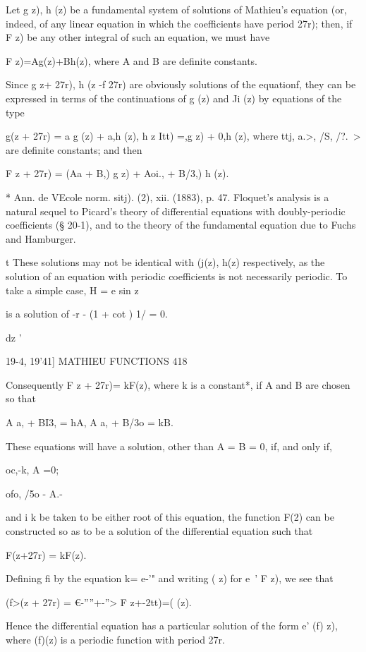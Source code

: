 Let g z), h (z) be a fundamental system of solutions of Mathieu's
equation (or, indeed, of any linear equation in which the coefficients
have period 27r); then, if F z) be any other integral of such an
equation, we must have

F z)=Ag(z)+Bh(z), where A and B are definite constants.

Since g z+ 27r), h (z -f 27r) are obviously solutions of the
equationf, they can be expressed in terms of the continuations of g
(z) and Ji (z) by equations of the type

g(z + 27r) = a g (z) + a,h (z), h z Itt) =,g z) + 0,h (z), where ttj,
a.>, /S, /?.\ > are definite constants; and then

F z + 27r) = (Aa + B,) g z) + Aoi., + B/3,) h (z).

* Ann. de VEcole norm. sitj). (2), xii. (1883), p. 47. Floquet's
analysis is a natural sequel to Picard's theory of differential
equations with doubly-periodic coefficients (§ 20-1), and to the
theory of the fundamental equation due to Fuchs and Hamburger.

t These solutions may not be identical with (j(z), h(z) respectively,
as the solution of an equation with periodic coefficients is not
necessarily periodic. To take a simple case, H = e sin z

is a solution of -r - (1 + cot ) 1/ = 0.

dz '

19-4, 19'41] MATHIEU FUNCTIONS 418

Consequently F z + 27r)= kF(z), where k is a constant*, if A and B are
chosen so that

A a, + BI3, = hA, A a, + B/3o = kB.

These equations will have a solution, other than A = B = 0, if, and
only if,

oc,-k, A =0;

ofo, /5o - A.-

and i k be taken to be either root of this equation, the function F(2)
can be constructed so as to be a solution of the differential equation
such that

F(z+27r) = kF(z).

Defining fi by the equation k= e-'" and writing ( z) for e~' F z), we
see that

(f>(z + 27r) = €-''''+-''> F z+-2tt)=( (z).

Hence the differential equation has a particular solution of the form
e' (f) z), where (f)(z) is a periodic function with period 27r.

